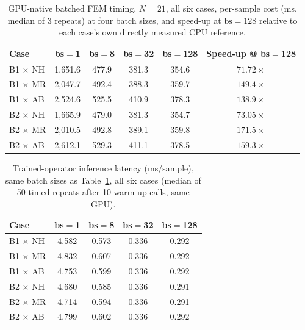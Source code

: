 \documentclass[final,5p,times]{elsarticle}
\begin{document}
\begin{table}[ht]
\centering
\caption{GPU-native batched FEM timing, $N{=}21$, all six cases,
  per-sample cost (ms, median of 3 repeats) at four batch sizes, and
  speed-up at $\mathrm{bs}{=}128$ relative to each case's own directly
  measured CPU reference.}
\label{tab:a1-fem}
\small
\begin{tabular}{lccccc}
\toprule
Case & bs$=$1 & bs$=$8 & bs$=$32 & bs$=$128 & Speed-up @ bs$=$128 \\
\midrule
B1 $\times$ NH & 1{,}651.6 & 477.9 & 381.3 & 354.6 & $71.72\times$ \\
B1 $\times$ MR & 2{,}047.7 & 492.4 & 388.3 & 359.7 & $149.4\times$ \\
B1 $\times$ AB & 2{,}524.6 & 525.5 & 410.9 & 378.3 & $138.9\times$ \\
B2 $\times$ NH & 1{,}665.9 & 479.0 & 381.3 & 354.7 & $73.05\times$ \\
B2 $\times$ MR & 2{,}010.5 & 492.8 & 389.1 & 359.8 & $171.5\times$ \\
B2 $\times$ AB & 2{,}612.1 & 529.3 & 411.1 & 378.5 & $159.3\times$ \\
\bottomrule
\end{tabular}
\end{table}

\begin{table}[ht]
\centering
\caption{Trained-operator inference latency (ms/sample), same batch
  sizes as Table~\ref{tab:a1-fem}, all six cases (median of 50 timed
  repeats after 10 warm-up calls, same GPU).}
\label{tab:a1-op}
\small
\begin{tabular}{lcccc}
\toprule
Case & bs$=$1 & bs$=$8 & bs$=$32 & bs$=$128 \\
\midrule
B1 $\times$ NH & 4.582 & 0.573 & 0.336 & 0.292 \\
B1 $\times$ MR & 4.832 & 0.607 & 0.336 & 0.292 \\
B1 $\times$ AB & 4.753 & 0.599 & 0.336 & 0.292 \\
B2 $\times$ NH & 4.680 & 0.585 & 0.336 & 0.291 \\
B2 $\times$ MR & 4.714 & 0.594 & 0.336 & 0.291 \\
B2 $\times$ AB & 4.799 & 0.602 & 0.336 & 0.292 \\
\bottomrule
\end{tabular}
\end{table}
\end{document}
